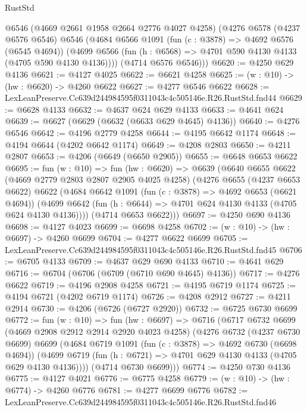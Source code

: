 \begin{lexlean}{RustStd}
\begin{coremodule}
      @6546
      (@4669 @2661 @1958 @2664 @2776 @4027 @4258)
      (@4276
        @6578
        (@4237 @6576 @6546)
        @6546
        (@4684
          @6566
          @1091
          (fun (c : @3878) => @4692 @6576 (@6545 @4694))
          (@4699 @6566 (fun (h : @6568) => @4701 @590 @4130 @4133 (@4705 @590 @4130 @4136))))
        (@4714 @6576 @6546)))
@6620 := @4250 @629 @4136
@6621 := @4127 @4025
@6622 := @6621 @4258
@6625 := (w : @10) -> (hw : @6620) -> @4260 @6622
@6627 := @4277 @6546 @6622
@6628 := LexLeanPreserve.Cc639d244984595f0311043c4c505146e.R26.RustStd.fnd44
@6629 := @6628 @4133
@6632 := @4637 @624 @629 @4133
@6633 := @4641 @624
@6639 := @6627 (@6629 (@6632 (@6633 @629 @4645) @4136))
@6640 := @4276 @6546
@6642 := @4196 @2779 @4258
@6644 := @4195 @6642 @1174
@6648 := @4194 @6644 (@4202 @6642 @1174)
@6649 := @4208 @2803
@6650 := @4211 @2807
@6653 := @4206 (@6649 (@6650 @2905))
@6655 := @6648 @6653 @6622
@6695 := fun (w : @10) =>
  fun (hw : @6620) =>
  @6639
    (@6640
      @6655
      @6622
      (@4669 @2779 @2803 @2807 @2905 @4025 @4258)
      (@4276
        @6655
        (@4237 @6653 @6622)
        @6622
        (@4684
          @6642
          @1091
          (fun (c : @3878) => @4692 @6653 (@6621 @4694))
          (@4699 @6642 (fun (h : @6644) => @4701 @624 @4130 @4133 (@4705 @624 @4130 @4136))))
        (@4714 @6653 @6622)))
@6697 := @4250 @690 @4136
@6698 := @4127 @4023
@6699 := @6698 @4258
@6702 := (w : @10) -> (hw : @6697) -> @4260 @6699
@6704 := @4277 @6622 @6699
@6705 := LexLeanPreserve.Cc639d244984595f0311043c4c505146e.R26.RustStd.fnd45
@6706 := @6705 @4133
@6709 := @4637 @629 @690 @4133
@6710 := @4641 @629
@6716 := @6704 (@6706 (@6709 (@6710 @690 @4645) @4136))
@6717 := @4276 @6622
@6719 := @4196 @2908 @4258
@6721 := @4195 @6719 @1174
@6725 := @4194 @6721 (@4202 @6719 @1174)
@6726 := @4208 @2912
@6727 := @4211 @2914
@6730 := @4206 (@6726 (@6727 @2920))
@6732 := @6725 @6730 @6699
@6772 := fun (w : @10) =>
  fun (hw : @6697) =>
  @6716
    (@6717
      @6732
      @6699
      (@4669 @2908 @2912 @2914 @2920 @4023 @4258)
      (@4276
        @6732
        (@4237 @6730 @6699)
        @6699
        (@4684
          @6719
          @1091
          (fun (c : @3878) => @4692 @6730 (@6698 @4694))
          (@4699 @6719 (fun (h : @6721) => @4701 @629 @4130 @4133 (@4705 @629 @4130 @4136))))
        (@4714 @6730 @6699)))
@6774 := @4250 @730 @4136
@6775 := @4127 @4021
@6776 := @6775 @4258
@6779 := (w : @10) -> (hw : @6774) -> @4260 @6776
@6781 := @4277 @6699 @6776
@6782 := LexLeanPreserve.Cc639d244984595f0311043c4c505146e.R26.RustStd.fnd46

\end{coremodule}
\end{lexlean}
